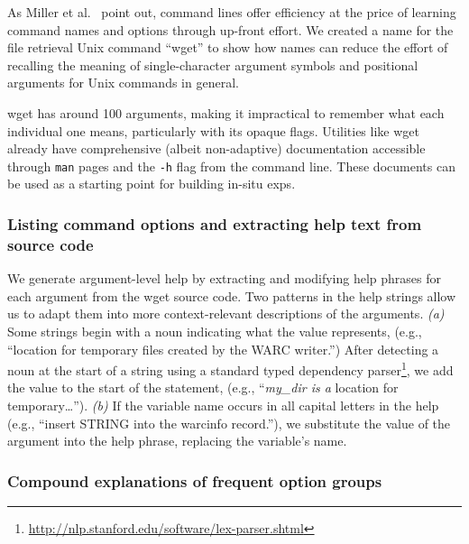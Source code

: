 \begin{changes}
As Miller et al.~\cite{miller_inky_2008} point out, command lines offer efficiency at the price of learning command names and options through up-front effort.
We created a \Gls{name} for the file retrieval Unix command ``wget'' to show how \Glspl{name} can reduce the effort of recalling the meaning of single-character argument symbols and positional arguments for Unix commands in general.
\end{changes}
wget has around 100 arguments, making it impractical to remember what each individual one means, particularly with its opaque flags.
Utilities like wget already have comprehensive (albeit non-adaptive) documentation accessible through \texttt{man} pages and the \texttt{-h} flag from the command line.
These documents can be used as a starting point for building in-situ \glspl{exp}.

\subsubsection{Listing command options and extracting help text from source code}

We generate argument-level help by extracting and modifying help phrases for each argument from the wget source code.
Two patterns in the help strings allow us to adapt them into more context-relevant descriptions of the arguments.
\emph{(a)} Some strings begin with a noun indicating what the value represents, (e.g., ``location for temporary files created by the WARC writer.'')
After detecting a noun at the start of a string using a standard typed dependency parser\footnote{\url{http://nlp.stanford.edu/software/lex-parser.shtml}}, we add the value to the start of the statement, (e.g., ``\emph{my\_dir is a} location for temporary\dots{}'').
\emph{(b)} If the variable name occurs in all capital letters in the help (e.g., ``insert STRING into the warcinfo record.''), we substitute the value of the argument into the help phrase, replacing the variable's name.

\subsubsection{Compound explanations of frequent option groups}

